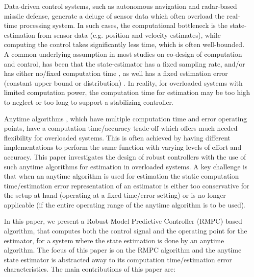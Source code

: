 Data-driven control systems, such as autonomous navigation and radar-based missile defense, generate a deluge of sensor data which often overload the real-time processing system. In such cases, the computational bottleneck is the state-estimation from sensor data (e.g. position and velocity estimates), while computing the control takes significantly less time, which is often well-bounded.
A common underlying assumption in most studies on co-design of computation and control, 
has been that the state-estimator has a fixed sampling rate, and/or has either no/fixed computation time \cite{balas}, as well has a fixed estimation error (constant upper bound or distribution) \cite{richardsetal05rmp}. In reality, for overloaded systems with limited computation power, the computation time for estimation may be too high to neglect or too long to support a stabilizing controller. 

Anytime algorithms \cite{boddy}, which have multiple computation time and error operating points, have a computation time/accuracy trade-off which offers much needed flexibility for overloaded systems. This is often achieved by having  different implementations to perform the same function with varying levels of effort and accuracy. This paper investigates the design of robust controllers with the use of such anytime algorithms for estimation in overloaded systems. A key challenge is that when an anytime algorithm is used for estimation the static computation time/estimation error representation of an estimator is either too conservative for the setup at hand (operating at a fixed time/error setting) or is no longer applicable (if the entire operating range of the anytime algorithm is to be used).

In this paper, we present a Robust Model Predictive Controller (RMPC) based algorithm, that computes both the control signal and the operating point for the estimator, for a system where the state estimation is done by an anytime algorithm. %
The focus of this paper is on the RMPC algorithm and the anytime state estimator is abstracted away to its computation time/estimation error characteristics. 
The main contributions of this paper are:

